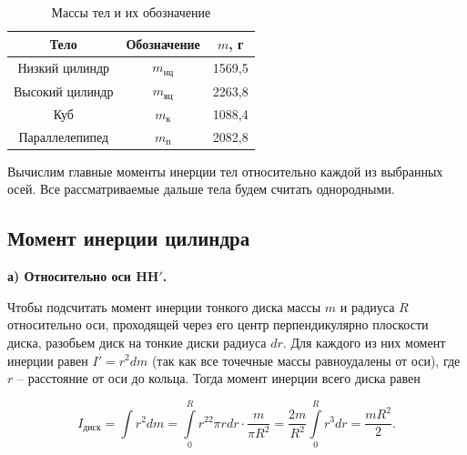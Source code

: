 \documentclass[a4paper, 12pt]{article}
\begin{document}
        \begin{table}[H]
            \centering
            \caption{Массы тел и их обозначение}
            \vspace{-3mm}
            \begin{tabular}{|c|c|c|}
                \hline
                Тело & Обозначение & $m$, г \\
                \hline
                Низкий цилиндр & $m_{нц}$ & 1569,5 \\
                \hline
                Высокий цилиндр & $m_{вц}$ & 2263,8 \\
                \hline
                Куб & $m_{к}$ & 1088,4 \\
                \hline
                Параллелепипед & $m_{п}$ & 2082,8 \\
                \hline
            \end{tabular}
        \end{table}

        Вычислим главные моменты инерции тел относительно каждой из выбранных осей. Все рассматриваемые дальше тела будем считать однородными.

        \subsection*{Момент инерции цилиндра}

        \textbf{а) Относительно оси $\boldsymbol{HH'}$.}

        Чтобы подсчитать момент инерции тонкого диска массы $m$ и радиуса $R$ относительно оси, проходящей через его центр перпендикулярно плоскости диска, разобьем диск на тонкие диски радиуса $dr$. Для каждого из них момент инерции равен $I' = r^2dm$ (так как все точечные массы равноудалены от оси), где $r$ -- расстояние от оси до кольца. Тогда момент инерции всего диска равен
        
        \begin{equation*}
            I_{диск} = \int r^2dm = \int\limits_0^Rr^22\pi rdr \cdot \frac{m}{\pi R^2} = \frac{2m}{R^2} \int\limits_0^R r^3dr = \frac{mR^2}{2}.
        \end{equation*}
\end{document}
